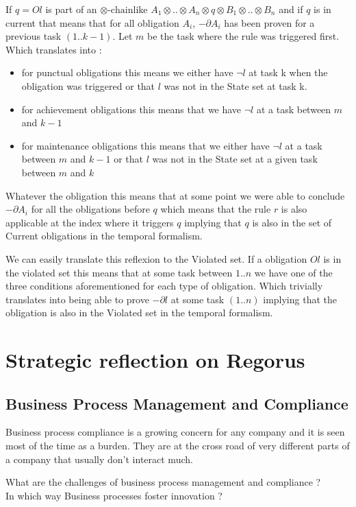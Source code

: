 \documentclass[10pt]{report}
\newcommand{\ochain}{$\otimes \text{-chain}$}
\begin{document}
If $q=Ol$ is part of an \ochain like $A_{1}\otimes .. \otimes A_{n} \otimes q \otimes B_{1} \otimes .. \otimes B_{n}$ and if $q$ is in current that means that for all obligation $A_{i}$, $-\partial A_{i}$ has been proven for a previous task $(1..k-1)$. Let $m$ be the task where the rule was triggered first. Which translates into :
\begin{itemize}
\item for punctual obligations this means we either have $\neg l$ at task k when the obligation was triggered or that $l$ was not in the State set at task k.
\item for achievement obligations this means that we have $\neg l$ at a task between $m$ and $k-1$
\item for maintenance obligations this means that we either have $\neg l$ at a task between $m$ and $k-1$ or that $l$ was not in the State set at a given task between $m$ and $k$ 
\end{itemize}

Whatever the obligation this means that at some point we were able to conclude $-\partial A_{i}$ for all the obligations before $q$ which means that the rule $r$ is also applicable at the index where it triggers $q$ implying that $q$ is also in the set of Current obligations in the temporal formalism.

We can easily translate this reflexion to the Violated set. If a obligation $Ol$ is in the violated set this means that at some task between $1..n$ we have one of the three conditions aforementioned for each type of obligation. Which trivially translates into being able to prove $-\partial l$ at some task $(1..n)$ implying that the obligation is also in the Violated set in the temporal formalism.

\newpage
\chapter{Strategic reflection on Regorus}

\section{Business Process Management and Compliance}
Business process compliance is a growing concern for any company and it is seen most of the time as a burden.  They are at the cross road of very different parts of a company that usually don't interact much.

What are the challenges of business process management and compliance ?\\
In which way Business processes foster innovation ?
\end{document}
